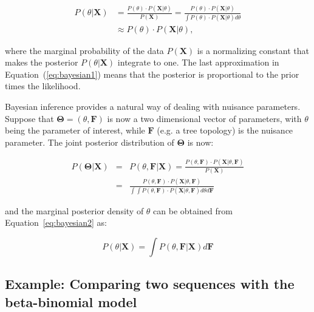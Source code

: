 \begin{align}
P\left(\theta|\mathbf{X}\right) &= \frac{P(\theta)\cdot P\left(\mathbf{X}|\theta\right)}{P\left(\mathbf{X}\right)}=\frac{P(\theta)\cdot P\left(\mathbf{X}|\theta\right)}{\int P(\theta)\cdot P\left(\mathbf{X}|\theta\right)d\theta}  \nonumber \\
& \approx  P(\theta)\cdot P\left(\mathbf{X}|\theta\right),
\label{eq:bayesian1}
\end{align}

\noindent
where the marginal probability of the data $P\left(\mathbf{X}\right)$ is a normalizing constant that makes the posterior $P\left(\theta|\mathbf{X}\right)$ integrate to one.
The last approximation in Equation~(\ref{eq:bayesian1}) means that the posterior is proportional to the prior times the likelihood.

Bayesian inference provides a natural way of dealing with nuisance parameters.
Suppose that $\mathbf{\Theta}=\left(\theta,\mathbf{F}\right)$ is now a two dimensional vector of parameters, with $\theta$ being the parameter of interest, while 
$\mathbf{F}$ (e.g. a tree topology) is the nuisance parameter.
The joint posterior distribution of $\mathbf{\Theta}$ is now:

\begin{eqnarray}
P\left(\mathbf{\Theta}|\mathbf{X}\right) &=& P\left(\theta,\mathbf{F}|\mathbf{X}\right)=\frac{P\left(\theta,\mathbf{F}\right)\cdot P\left(\mathbf{X}|\theta,\mathbf{F}\right)}{P\left(\mathbf{X}\right)}  \nonumber \\
&=& \frac{P\left(\theta,\mathbf{F}\right)\cdot P\left(\mathbf{X}|\theta,\mathbf{F}\right)}{\int\int P(\theta,\mathbf{F})\cdot P\left(\mathbf{X}|\theta,\mathbf{F}\right)d\theta d\mathbf{F}}
\label{eq:bayesian2}
\end{eqnarray}

\noindent
and the marginal posterior density of $\theta$ can be obtained from Equation~\ref{eq:bayesian2} as:

\begin{equation}
P\left(\theta|\mathbf{X}\right) =\int P\left(\theta,\mathbf{F}|\mathbf{X}\right)d\mathbf{F}
\label{eq:bayesian3}
\end{equation}

\subsection{Example: Comparing two sequences with the beta-binomial model}

